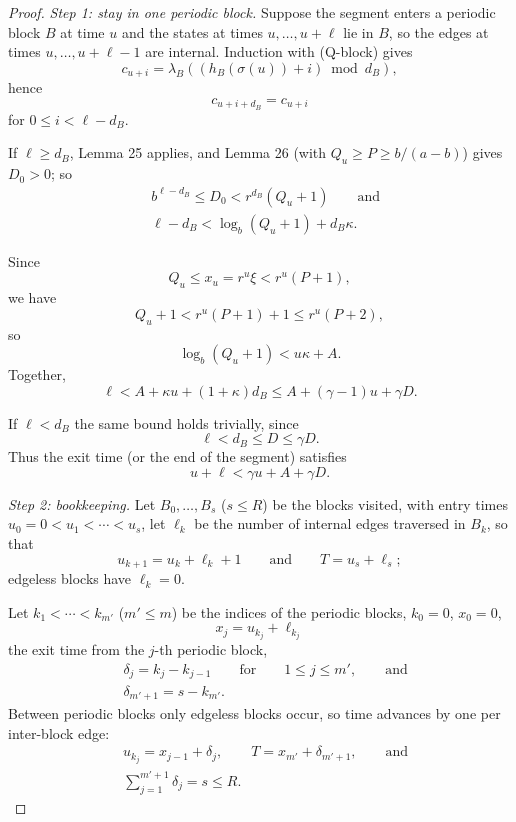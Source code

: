 \documentclass[11pt,reqno]{amsart}
\theoremstyle{definition}
\theoremstyle{remark}
\begin{document}
\begin{proof}\leavevmode\label{proof:27}
\emph{Step 1: stay in one periodic block.} Suppose the segment
enters a periodic block \(B\) at time \(u\) and the states at times
\(u,\ldots,u+\ell\) lie in \(B\), so the edges at times
\(u,\ldots,u+\ell-1\) are internal. Induction with (Q-block) gives
\[
c_{u+i}=\lambda_B((h_B(\sigma(u))+i)\bmod d_B),
\]
hence
\[
c_{u+i+d_B}=c_{u+i}
\]
for \(0\le i<\ell-d_B\).

If \(\ell\ge d_B\),
Lemma 25 applies, and Lemma 26 (with \(Q_u\ge P\ge b/(a-b)\)) gives
\(D_0>0\); so
\[
\begin{aligned}
&b^{\ell-d_B}\le D_0<r^{d_B}(Q_u+1)\qquad\text{and}\\
&\ell-d_B<\log_b(Q_u+1)+d_B\kappa.
\end{aligned}
\]

Since
\[
Q_u\le x_u=r^u\xi<r^u(P+1),
\]
we have
\[
Q_u+1<r^u(P+1)+1\le r^u(P+2),
\]
so
\[
\log_b(Q_u+1)<u\kappa+A.
\]
Together,
\[
\ell<A+\kappa u+(1+\kappa)d_B\le A+(\gamma-1)u+\gamma D.
\]

If \(\ell<d_B\) the same bound holds trivially, since
\[
\ell<d_B\le D\le\gamma D.
\]
Thus the exit time (or the end of the
segment) satisfies
\[
u+\ell<\gamma u+A+\gamma D.
\]

\emph{Step 2: bookkeeping.} Let \(B_0,\ldots,B_s\) (\(s\le R\)) be the
blocks visited, with entry times \(u_0=0<u_1<\cdots<u_s\), let
\(\ell_k\) be the number of internal edges traversed in \(B_k\), so that
\[
u_{k+1}=u_k+\ell_k+1\qquad \text{and}\qquad T=u_s+\ell_s;
\]
edgeless blocks have
\(\ell_k=0\).

Let \(k_1<\cdots<k_{m'}\) (\(m'\le m\)) be the indices of
the periodic blocks, \(k_0=0\), \(x_0=0\),
\[
x_j=u_{k_j}+\ell_{k_j}
\]
the exit time from the \(j\)-th periodic block,
\[
\begin{aligned}
&\delta_j=k_j-k_{j-1}\qquad \text{for}\qquad 1\le j\le m',\qquad\text{and}\\
&\delta_{m'+1}=s-k_{m'}.
\end{aligned}
\]
Between periodic blocks only edgeless blocks
occur, so time advances by one per inter-block edge:
\[
\begin{aligned}
&u_{k_j}=x_{j-1}+\delta_j,\qquad T=x_{m'}+\delta_{m'+1},\qquad\text{and}\\
&\sum_{j=1}^{m'+1}\delta_j=s\le R.
\end{aligned}
\]


\end{proof}
\end{document}
